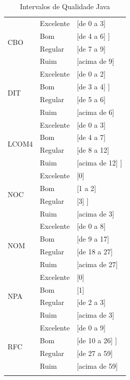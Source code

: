 \begin{longtable}{|l|l|l|}
		 \multirow{4}{*}{CBO} 
		 & Excelente & [de 0 a 3]  \\
		 & Bom & [de 4 a 6] ] \\
		 & Regular & [de 7 a 9]  \\
		 & Ruim & [acima de 9] \\ \hline

		 \multirow{4}{*}{DIT} 
		 & Excelente & [de 0 a 2]   \\
		 & Bom & [de 3 a 4]  ] \\
		 & Regular & [de 5 a 6]   \\
		 & Ruim & [acima de 6]  \\ \hline

		 \multirow{4}{*}{LCOM4} 
		 & Excelente & [de 0 a 3]  \\
		 & Bom & [de 4 a 7]  \\
		 & Regular & [de 8 a 12]   \\
		 & Ruim & [acima de 12]  ] \\ \hline



		 \multirow{4}{*}{NOC} 
		 & Excelente & [0]  \\
		 & Bom & [1 a 2]   \\
		 & Regular & [3]  ] \\
		 & Ruim & [acima de 3]   \\ \hline



		 \multirow{4}{*}{NOM} 
		 & Excelente & [de 0 a 8]   \\
		 & Bom & [de 9 a 17]   \\
		 & Regular & [de 18 a 27]  \\
		 & Ruim & [acima de 27]   \\ \hline




		 \multirow{4}{*}{NPA} 
		 & Excelente & [0]   \\
		 & Bom & [1]   \\
		 & Regular & [de 2 a 3]   \\
		 & Ruim & [acima de 3]  \\ \hline


		 \multirow{4}{*}{RFC} 
		 & Excelente & [de 0 a 9]   \\
		 & Bom & [de 10 a 26]  ] \\
		 & Regular & [de 27 a 59]   \\
		 & Ruim & [acima de 59]   \\ \hline
 	

			\caption{Intervalos de Qualidade Java}
	\end{longtable}

